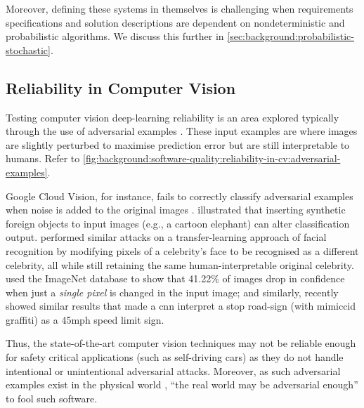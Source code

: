 Moreover, defining these systems in themselves is challenging when requirements specifications and solution descriptions are dependent on nondeterministic and probabilistic algorithms. We discuss this further in \cref{sec:background:probabilistic-stochastic}.

\subsection{Reliability in Computer Vision}
\label{ssec:background:software-quality:reliability-in-cv}

Testing computer vision deep-learning reliability is an area explored typically through the use of adversarial examples \citep{Szegedy:2013vw}. These input examples are where images are slightly perturbed to maximise prediction error but are still interpretable to humans. Refer to \cref{fig:background:software-quality:reliability-in-cv:adversarial-examples}.



Google Cloud Vision, for instance, fails to correctly classify adversarial examples when noise is added to the original images \citep{Hosseini:2018jr}. \citet{Rosenfeld:2018ut} illustrated that inserting synthetic foreign objects to input images (e.g., a cartoon elephant) can alter classification output. \citet{Wang:2018vl} performed similar attacks on a transfer-learning approach of facial recognition by modifying pixels of a celebrity's face to be recognised as a different celebrity, all while still retaining the same human-interpretable original celebrity. \citet{Su:2017uw} used the ImageNet database to show that 41.22\% of images drop in confidence when just a \textit{single pixel} is changed in the input image; and similarly, \citet{Eykholt:2018vka} recently showed similar results that made a \gls{cnn} interpret a stop road-sign (with mimiccid graffiti) as a 45mph speed limit sign.

Thus, the state-of-the-art computer vision techniques may not be reliable enough for safety critical applications (such as self-driving cars) as they do not handle intentional or unintentional adversarial attacks. Moreover, as such adversarial examples exist in the physical world \citep{Kurakin:2016vw,Eykholt:2018vk}, ``the real world may be adversarial enough'' \citep{Pezzementi:2018tq} to fool such software.

